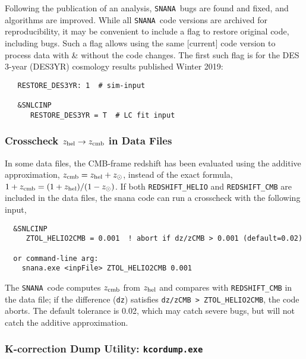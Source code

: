 \documentclass[12pt]{article}
\newcommand{\snana}{{\tt SNANA}}
\newcommand{\zhelio}{z_{\rm hel}}
\newcommand{\zcmb}{z_{\rm cmb}}
\newcommand{\zsun}{z_{\odot}}
\begin{document}
{Following the publication of an analysis, \snana\ bugs are
found and fixed, and algorithms are improved.
While all \snana\ code versions are archived for reproducibility,
it may be convenient to include a flag to restore original code,
including bugs. Such a flag allows using the same [current] code 
version to process data with \& without the code changes. 
The first such flag is for the DES 3-year (DES3YR) cosmology results 
published Winter 2019:
% 
\begin{verbatim}
   RESTORE_DES3YR: 1  # sim-input

   &SNLCINP
      RESTORE_DES3YR = T  # LC fit input
\end{verbatim}


 \clearpage 
  \subsubsection{Crosscheck $\zhelio \rightarrow \zcmb$ in Data Files}
  \label{sss:check_ztranslate}

In some data files, the CMB-frame redshift has been evaluated
using the additive approximation, $\zcmb = \zhelio + \zsun$,
instead of the exact formula, $1+ \zcmb =  (1+\zhelio)/(1-\zsun)$.
If both {\tt REDSHIFT\_HELIO} and {\tt REDSHIFT\_CMB} are included
in the data files, the snana code can run a crosscheck with the
following input,
\begin{verbatim}
  &SNLCINP
     ZTOL_HELIO2CMB = 0.001  ! abort if dz/zCMB > 0.001 (default=0.02)

  or command-line arg:
    snana.exe <inpFile> ZTOL_HELIO2CMB 0.001
\end{verbatim}
The \snana\ code computes $\zcmb$ from $\zhelio$ and compares
with {\tt REDSHIFT\_CMB} in the data file; if the difference
({\tt dz}) satisfies {\tt dz/zCMB > ZTOL\_HELIO2CMB}, the code aborts.
The default tolerance is 0.02, which may catch severe bugs, 
but will not catch the additive approximation.


  \subsubsection{K-correction Dump Utility: {\tt kcordump.exe}}
  \label{sss:kcordump}

}
\end{document}
